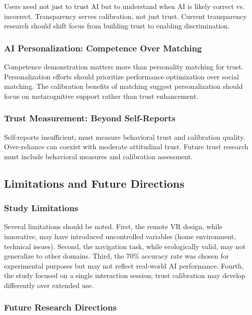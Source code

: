 \documentclass[12pt]{article}
\begin{document}
Users need not just to trust AI but to understand when AI is likely correct vs. incorrect. Transparency serves calibration, not just trust. Current transparency research should shift focus from building trust to enabling discrimination.

\subsubsection{AI Personalization: Competence Over Matching}

Competence demonstration matters more than personality matching for trust. Personalization efforts should prioritize performance optimization over social matching. The calibration benefits of matching suggest personalization should focus on metacognitive support rather than trust enhancement.

\subsubsection{Trust Measurement: Beyond Self-Reports}

Self-reports insufficient; must measure behavioral trust and calibration quality. Over-reliance can coexist with moderate attitudinal trust. Future trust research must include behavioral measures and calibration assessment.

\subsection{Limitations and Future Directions}

\subsubsection{Study Limitations}

Several limitations should be noted. First, the remote VR design, while innovative, may have introduced uncontrolled variables (home environment, technical issues). Second, the navigation task, while ecologically valid, may not generalize to other domains. Third, the 70\% accuracy rate was chosen for experimental purposes but may not reflect real-world AI performance. Fourth, the study focused on a single interaction session; trust calibration may develop differently over extended use.

\subsubsection{Future Research Directions}
\end{document}
